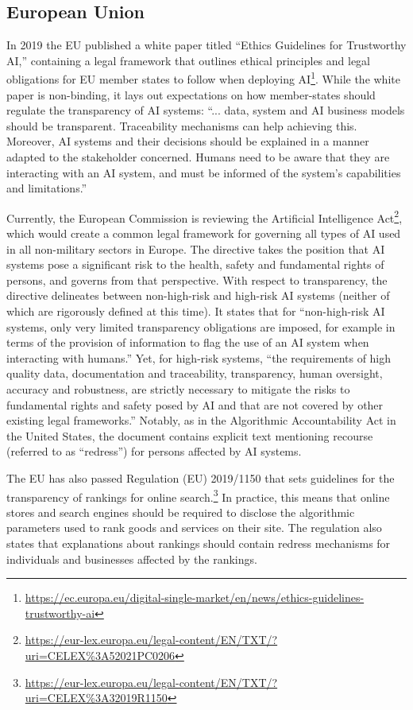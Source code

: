 \subsection{European Union}

In 2019 the EU published a white paper titled ``Ethics Guidelines for Trustworthy AI,'' containing a legal framework that outlines ethical principles and legal obligations for EU member states to follow when deploying AI\footnote{\url{https://ec.europa.eu/digital-single-market/en/news/ethics-guidelines-trustworthy-ai}}. While the white paper is non-binding, it lays out expectations on how member-states should regulate the transparency of AI systems: ``... data, system and AI business models should be transparent. Traceability mechanisms can help achieving this. Moreover, AI systems and their decisions should be explained in a manner adapted to the stakeholder concerned. Humans need to be aware that they are interacting with an AI system, and must be informed of the system’s capabilities and limitations.''

Currently, the European Commission is reviewing the Artificial Intelligence Act\footnote{\url{https://eur-lex.europa.eu/legal-content/EN/TXT/?uri=CELEX\%3A52021PC0206}}, which would create a common legal framework for governing all types of AI used in all non-military sectors in Europe. The directive takes the position that AI systems pose a significant risk to the health, safety and fundamental rights of persons, and governs from that perspective. With respect to transparency, the directive delineates between non-high-risk and high-risk AI systems (neither of which are rigorously defined at this time). It states that for ``non-high-risk AI systems, only very limited transparency obligations are imposed, for example in terms of the provision of information to flag the use of an AI system when interacting with humans.'' Yet, for high-risk systems, ``the requirements of high quality data, documentation and traceability, transparency, human oversight, accuracy and robustness, are strictly necessary to mitigate the risks to fundamental rights and safety posed by AI and that are not covered by other existing legal frameworks.'' Notably, as in the Algorithmic Accountability Act in the United States, the document contains explicit text mentioning recourse (referred to as ``redress'') for persons affected by AI systems.

The EU has also passed Regulation (EU) 2019/1150 that sets guidelines for the transparency of rankings for online search.\footnote{\url{https://eur-lex.europa.eu/legal-content/EN/TXT/?uri=CELEX\%3A32019R1150}} In practice, this means that online stores and search engines should be required to disclose the algorithmic parameters used to rank goods and services on their site. The regulation also states that explanations about rankings should contain redress mechanisms for individuals and businesses affected by the rankings.

